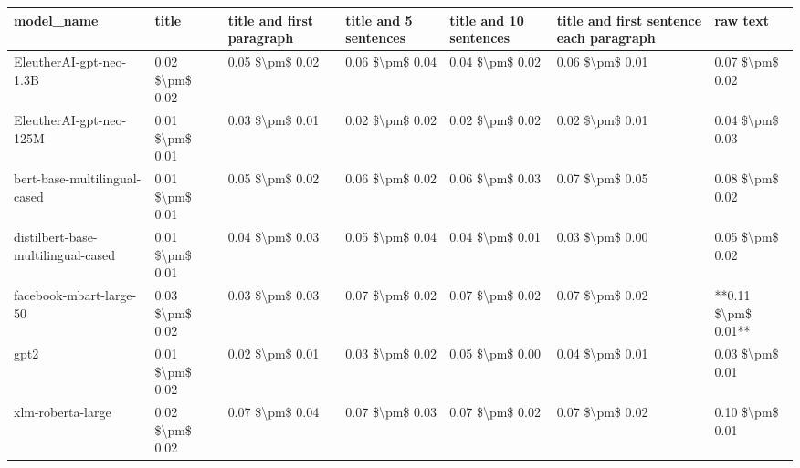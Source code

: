 \begin{tabular}{lllllll}
\toprule
                        model\_name &           title & title and first paragraph & title and 5 sentences & title and 10 sentences & title and first sentence each paragraph &            raw text \\
\midrule
           EleutherAI-gpt-neo-1.3B & 0.02 \$\textbackslash pm\$ 0.02 &           0.05 \$\textbackslash pm\$ 0.02 &       0.06 \$\textbackslash pm\$ 0.04 &        0.04 \$\textbackslash pm\$ 0.02 &                         0.06 \$\textbackslash pm\$ 0.01 &     0.07 \$\textbackslash pm\$ 0.02 \\
           EleutherAI-gpt-neo-125M & 0.01 \$\textbackslash pm\$ 0.01 &           0.03 \$\textbackslash pm\$ 0.01 &       0.02 \$\textbackslash pm\$ 0.02 &        0.02 \$\textbackslash pm\$ 0.02 &                         0.02 \$\textbackslash pm\$ 0.01 &     0.04 \$\textbackslash pm\$ 0.03 \\
      bert-base-multilingual-cased & 0.01 \$\textbackslash pm\$ 0.01 &           0.05 \$\textbackslash pm\$ 0.02 &       0.06 \$\textbackslash pm\$ 0.02 &        0.06 \$\textbackslash pm\$ 0.03 &                         0.07 \$\textbackslash pm\$ 0.05 &     0.08 \$\textbackslash pm\$ 0.02 \\
distilbert-base-multilingual-cased & 0.01 \$\textbackslash pm\$ 0.01 &           0.04 \$\textbackslash pm\$ 0.03 &       0.05 \$\textbackslash pm\$ 0.04 &        0.04 \$\textbackslash pm\$ 0.01 &                         0.03 \$\textbackslash pm\$ 0.00 &     0.05 \$\textbackslash pm\$ 0.02 \\
           facebook-mbart-large-50 & 0.03 \$\textbackslash pm\$ 0.02 &           0.03 \$\textbackslash pm\$ 0.03 &       0.07 \$\textbackslash pm\$ 0.02 &        0.07 \$\textbackslash pm\$ 0.02 &                         0.07 \$\textbackslash pm\$ 0.02 & **0.11 \$\textbackslash pm\$ 0.01** \\
                              gpt2 & 0.01 \$\textbackslash pm\$ 0.02 &           0.02 \$\textbackslash pm\$ 0.01 &       0.03 \$\textbackslash pm\$ 0.02 &        0.05 \$\textbackslash pm\$ 0.00 &                         0.04 \$\textbackslash pm\$ 0.01 &     0.03 \$\textbackslash pm\$ 0.01 \\
                 xlm-roberta-large & 0.02 \$\textbackslash pm\$ 0.02 &           0.07 \$\textbackslash pm\$ 0.04 &       0.07 \$\textbackslash pm\$ 0.03 &        0.07 \$\textbackslash pm\$ 0.02 &                         0.07 \$\textbackslash pm\$ 0.02 &     0.10 \$\textbackslash pm\$ 0.01 \\
\bottomrule
\end{tabular}
